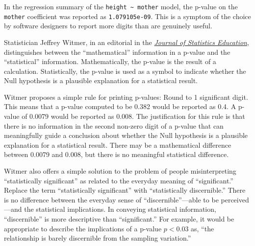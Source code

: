 \documentclass[
  letterpaper,
  DIV=11,
  numbers=noendperiod,
  oneside]{scrreprt}
\begin{document}
\begin{tcolorbox}[enhanced jigsaw, colbacktitle=quarto-callout-note-color!10!white, breakable, opacitybacktitle=0.6, colback=white, left=2mm, arc=.35mm, colframe=quarto-callout-note-color-frame, coltitle=black, toprule=.15mm, opacityback=0, leftrule=.75mm, bottomtitle=1mm, toptitle=1mm, titlerule=0mm, title=\textcolor{quarto-callout-note-color}{\faInfo}\hspace{0.5em}{``Significance'' and significant digits}, rightrule=.15mm, bottomrule=.15mm]

In the regression summary of the
\texttt{height\ \textasciitilde{}\ mother} model, the p-value on the
\texttt{mother} coefficient was reported as \texttt{1.079105e-09}. This
is a symptom of the choice by software designers to report more digits
than are genuinely useful.

Statistician Jeffrey Witmer, in an editorial in the
\href{https://www.tandfonline.com/doi/full/10.1080/10691898.2019.1702415}{\emph{Journal
of Statistics Education}}, distinguishes between the ``mathematical''
information in a p-value and the ``statistical'' information.
Mathematically, the p-value is the result of a calculation.
Statistically, the p-value is used as a symbol to indicate whether the
Null hypothesis is a plausible explanation for a statistical result.

Witmer proposes a simple rule for printing p-values: Round to 1
significant digit. This means that a p-value computed to be 0.382 would
be reported as 0.4. A p-value of 0.0079 would be reported as 0.008. The
justification for this rule is that there is no information in the
second non-zero digit of a p-value that can meaningfully guide a
conclusion about whether the Null hypothesis is a plausible explanation
for a statistical result. There may be a mathematical difference between
0.0079 and 0.008, but there is no meaningful statistical difference.

Witmer also offers a simple solution to the problem of people
misinterpreting ``statistically significant'' as related to the everyday
meaning of ``significant.'' Replace the term ``statistically
significant'' with ``statistically discernible.'' There is no difference
between the everyday sense of ``discernible''---able to be
perceived---and the statistical implications. In conveying statistical
information, ``discernible'' is more descriptive than ``significant.''
For example, it would be appropriate to describe the implications of a
p-value \(p < 0.03\) as, ``the relationship is barely discernible from
the sampling variation.''

\end{tcolorbox}
\end{document}
